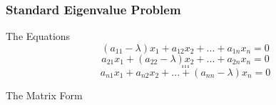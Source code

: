 \documentclass[fleqn]{beamer} %
\newcommand{\sectionIsubsectionIItitle}{Standard Eigenvalue Problem}
\begin{document}
			\begin{frame}
				\frametitle{\sectionIsubsectionIItitle} \small
				\bigskip

				The Equations \vspace{1mm}\\
				\[(a_{11}-\lambda) x_1 + a_{12} x_{2} + ... + a_{1n} x_n = 0 \]
				\[a_{21} x_1 + (a_{22}-\lambda)  x_{2} + ... + a_{2n} x_n = 0 \]
				\[. . .\]
				\[. . .\]
				\[a_{n1} x_1 + a_{n2} x_{2} + ... + (a_{nn}-\lambda) x_n = 0 \]	

				The Matrix Form \\

				\btVFill
			\end{frame}

\end{document}
